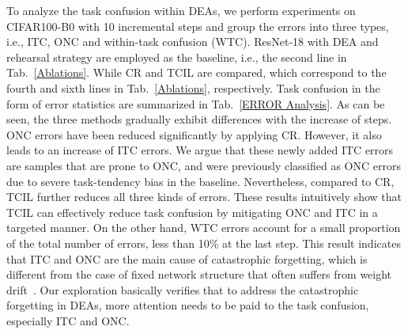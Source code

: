\documentclass[letterpaper]{article} \usepackage{aaai23}  \usepackage{times}  \usepackage{helvet}  \usepackage{courier}  \usepackage[hyphens]{url}  \usepackage{graphicx} \urlstyle{rm} \def\UrlFont{\rm}  \usepackage{natbib}  \usepackage{caption} \frenchspacing  \setlength{\pdfpagewidth}{8.5in}  \setlength{\pdfpageheight}{11in}  \usepackage{algorithm}
\begin{document}
To analyze the task confusion within DEAs, we perform experiments on CIFAR100-B0 with 10 incremental steps and group the errors into three types, i.e., ITC, ONC and within-task confusion (WTC). ResNet-18 with DEA and rehearsal strategy are employed as the baseline, i.e., the second line in Tab.~\ref{Ablations}. While CR and TCIL are compared, which correspond to the fourth and sixth lines in Tab.~\ref{Ablations}, respectively. Task confusion in the form of error statistics are summarized in Tab.~\ref{ERROR Analysis}. As can be seen, the three methods gradually exhibit differences with the increase of steps. ONC errors have been reduced significantly by applying CR. However, it also leads to an increase of ITC errors. We argue that these newly added ITC errors are samples that are prone to ONC, and were previously classified as ONC errors due to severe task-tendency bias in the baseline. Nevertheless, compared to CR, TCIL further reduces all three kinds of errors. These results intuitively show that TCIL can effectively reduce task confusion by mitigating ONC and ITC in a targeted manner. On the other hand, WTC errors account for a small proportion of the total number of errors, less than 10\% at the last step. This result indicates that ITC and ONC are the main cause of catastrophic forgetting, which is different from the case of fixed network structure that often suffers from weight drift~\cite{e2, t38}. Our exploration basically verifies that to address the catastrophic forgetting in DEAs, more attention needs to be paid to the task confusion,  especially ITC and ONC.
\end{document}
